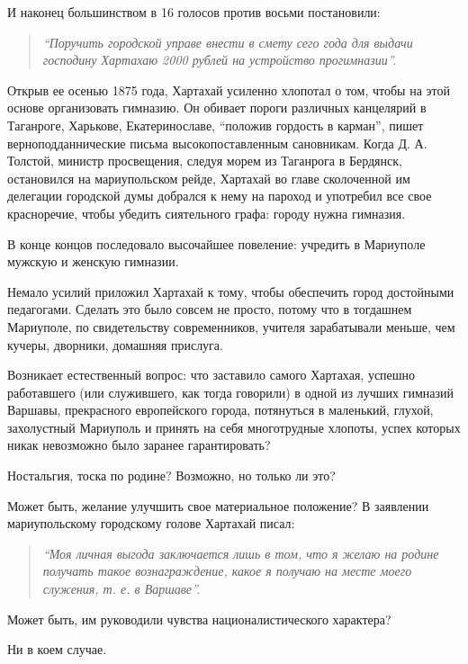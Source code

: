 И наконец большинством в 16 голосов против восьми постановили: 

\begin{quote}
\em\enquote{Поручить городской управе внести в смету
сего года для выдачи господину Хартахаю 2000 рублей на устройство прогимназии}.
\end{quote}

Открыв ее осенью 1875 года, Хартахай усиленно хлопотал о том, чтобы на этой
основе организовать гимназию. Он обивает пороги различных канцелярий в
Таганроге, Харькове, Екатеринославе, \enquote{положив гордость в карман}, пишет
верноподданнические письма высокопоставленным сановникам. Когда Д. А. Толстой,
министр просвещения, следуя морем из Таганрога в Бердянск, остановился на
мариупольском рейде, Хартахай во главе сколоченной им делегации городской думы
добрался к нему на пароход и употребил все свое красноречие, чтобы убедить
сиятельного графа: городу нужна гимназия.

В конце концов последовало высочайшее повеление: учредить в Мариуполе мужскую и
женскую гимназии.

Немало усилий приложил Хартахай к тому, чтобы обеспечить город достойными
педагогами. Сделать это было совсем не просто, потому что в тогдашнем
Мариуполе, по свидетельству современников, учителя зарабатывали меньше, чем
кучеры, дворники, домашняя прислуга.

Возникает естественный вопрос: что заставило самого Хартахая, успешно
работавшего (или служившего, как тогда говорили) в одной из лучших гимназий
Варшавы, прекрасного европейского города, потянуться в маленький, глухой,
захолустный Мариуполь и принять на себя многотрудные хлопоты, успех которых
никак невозможно было заранее гарантировать?

Ностальгия, тоска по родине? Возможно, но только ли это?

Может быть, желание улучшить свое материальное положение? В заявлении
мариупольскому городскому голове Хартахай писал: 

\begin{quote}
\em\enquote{Моя личная выгода заключается лишь в том, что я желаю на родине получать такое вознаграждение,
какое я получаю на месте моего служения, т. е. в Варшаве}.
\end{quote}

Может быть, им руководили чувства националистического характера?

Ни в коем случае.


